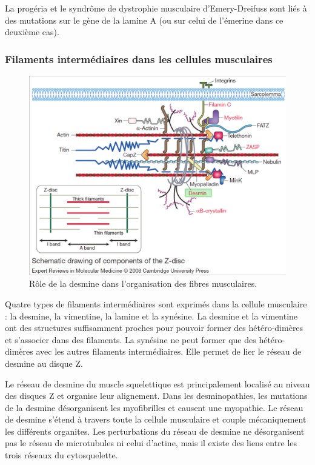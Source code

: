 La progéria et le syndrôme de dystrophie musculaire d'Emery-Dreifuss sont liés à des mutations sur le gène de la lamine A (ou sur celui de l'émerine dans ce deuxième cas). 


\subsubsection{Filaments intermédiaires dans les cellules musculaires}
\begin{figure}
\includegraphics[scale=0.15]{sarcomere.png}
\caption{Rôle de la desmine dans l'organisation des fibres musculaires.}
\end{figure}
Quatre types de filaments intermédiaires sont exprimés dans la cellule musculaire : la desmine, la vimentine, la lamine et la synésine. 
La desmine et la vimentine ont des structures suffisamment proches pour pouvoir former des hétéro-dimères et s'associer dans des filaments. La synésine ne peut former que des hétéro-dimères avec les autres filaments intermédiaires. Elle permet de lier le réseau de desmine au disque Z. 

Le réseau de desmine du muscle squelettique est principalement localisé au niveau des disques Z et organise leur alignement. Dans les desminopathies, les mutations de la desmine désorganisent les myofibrilles et causent une myopathie. 
Le réseau de desmine s'étend à travers toute la cellule musculaire et couple mécaniquement les différents organites. 
Les perturbations du réseau de desmine ne désorganisent pas le réseau de microtubules ni celui d'actine, mais il existe des liens entre les trois réseaux du cytosquelette. 

